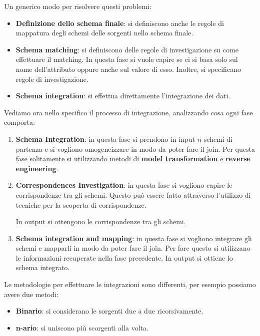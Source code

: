 Un generico modo per risolvere questi problemi:
\begin{itemize}

      \item \textbf{Definizione dello schema finale}: si definiscono anche le regole di
            mappatura degli schemi delle sorgenti nello schema finale.
      \item \textbf{Schema matching}: si definiscono delle regole di investigazione su come
            effettuare il matching. In questa fase si vuole capire se ci si basa
            solo sul nome dell'attributo oppure anche sul valore di esso. Inoltre,
            si specificano regole di investigazione.
      \item \textbf{Schema integration}: si effettua direttamente l'integrazione dei dati.

\end{itemize}
Vediamo ora nello specifico il processo di integrazione, analizzando cosa ogni
fase comporta:
\begin{enumerate}
      \item \textbf{Schema Integration}: in questa fase si prendono in input $n$
            schemi di partenza e si vogliono omogeneizzare in modo da poter fare
            il join. Per questa fase solitamente si utilizzando metodi di \textbf{
                  model transformation} e \textbf{reverse engineering}.
      \item \textbf{Correspondences Investigation}: in questa fase si vogliono
            capire le corrispondenze tra gli schemi. Questo può essere fatto
            attraverso l'utilizzo di tecniche per la scoperta di corrispondenze.

            In output si ottengono le corrispondenze tra gli schemi.
      \item \textbf{Schema integration and mapping}: in questa fase si vogliono
            integrare gli schemi e mapparli in modo da poter fare il join. Per
            fare questo si utilizzano le informazioni recuperate nella fase
            precedente. In output si ottiene lo schema integrato.
\end{enumerate}

Le metodologie per effettuare le integrazioni sono differenti, per esempio possiamo
avere due metodi:
\begin{itemize}
      \item \textbf{Binario}: si considerano le sorgenti due a due ricorsivamente.
      \item \textbf{n-ario}: si uniscono più scorgenti alla volta.
\end{itemize}

